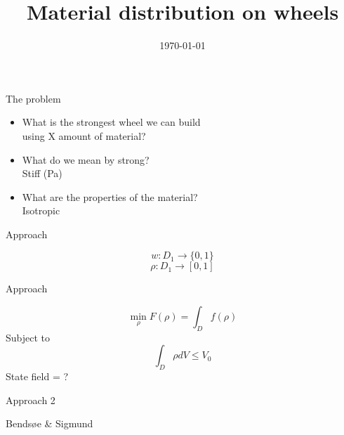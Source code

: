 \documentclass{beamer}
\title{Material distribution on wheels}
\date{\today}
\begin{document}
\maketitle

\begin{frame}{The problem}
    \begin{center}
        \begin{itemize}
           \item What is the strongest wheel we can build\\
               using X amount of material?\\
           \pause
           \item What do we mean by strong?\\
           \pause
           \quad Stiff (Pa)
           \pause
           \item What are the properties of the material?\\
           \pause
           \quad Isotropic
        \end{itemize}
    \end{center}
\end{frame}

\begin{frame}{Approach}
    \begin{center}
        \Huge
    \[
        w:D_1 \to \{0,1\}
    \]
    \pause
    \[
        \rho:D_1 \to [0,1]
    \]
    \end{center}
\end{frame}

\begin{frame}{Approach}
    \begin{center}
        \Huge
    \[
        \min_\rho F(\rho)=\int_Df(\rho)
    \]
    Subject to
    \[
        \int_D\rho dV\leq V_0
    \]
    \pause
    State field = ?
    \end{center}
\end{frame}

\begin{frame}{Approach 2}
    \begin{center}
        \Huge
        Bends{\o}e \& Sigmund
    \end{center}
\end{frame}
\end{document}
